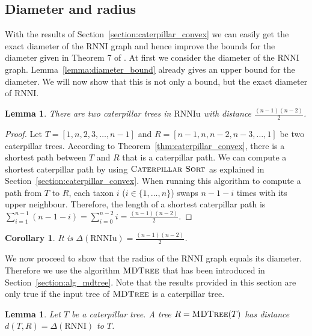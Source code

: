 \documentclass{amsart}
\newcommand{\rnni}{\mathrm{RNNI}}
\newcommand{\rnniu}{\mathrm{RNNIu}}
\newcommand{\csort}{\textsc{Caterpillar Sort}}
\newcommand{\mdtree}{\textsc{MDTree}}
\newtheorem{lemma}[definition]{Lemma}
\newtheorem{corollary}[definition]{Corollary}
\begin{document}
\subsection{Diameter and radius}
\label{section:diameter}

With the results of Section~\ref{section:caterpillar_convex} we can easily get the exact diameter of the $\rnni$ graph and hence improve the bounds for the diameter given in Theorem 7 of \autocite{Gavryushkin2018-ol}.
At first we consider the diameter of the $\rnni$ graph.
Lemma~\ref{lemma:diameter_bound} already gives an upper bound for the diameter.
We will now show that this is not only a bound, but the exact diameter of $\rnni$.

\begin{lemma}
There are two caterpillar trees in $\rnniu$ with distance $\frac{(n-1)(n-2)}{2}$.
\label{lemma:caterpillar_diameter}
\end{lemma}

\begin{proof}
Let $T = [1,n,2,3,\ldots,n-1]$ and $R = [n-1,n,n-2,n-3, \ldots, 1]$ be two caterpillar trees.
According to Theorem~\ref{thm:caterpillar_convex}, there is a shortest path between $T$ and $R$ that is a caterpillar path.
We can compute a shortest caterpillar path by using $\csort$ as explained in Section~\ref{section:caterpillar_convex}.
When running this algorithm to compute a path from $T$ to $R$, each taxon $i$ ($i \in \{1, \ldots, n\}$) swaps $n-1-i$ times with its upper neighbour.
Therefore, the length of a shortest caterpillar path is $\sum\limits_{i=1}^{n-1}(n-1-i) = \sum\limits_{i=0}^{n-2}i = \frac{(n-1)(n-2)}{2}$.
\end{proof}

\begin{corollary}
It is $\Delta(\rnniu) = \frac{(n-1)(n-2)}{2}$.
\label{corollary:diameter}
\end{corollary}

We now proceed to show that the radius of the $\rnni$ graph equals its diameter.
Therefore we use the algorithm $\mdtree$ that has been introduced in Section~\ref{section:alg_mdtree}.
Note that the results provided in this section are only true if the input tree of $\mdtree$ is a caterpillar tree.

\begin{lemma}
Let $T$ be a caterpillar tree.
A tree $R = \mdtree(T)$ has distance $d(T,R) = \Delta(\rnni)$ to $T$.
\label{lemma:max_dist_caterpillar}
\end{lemma}
\end{document}
